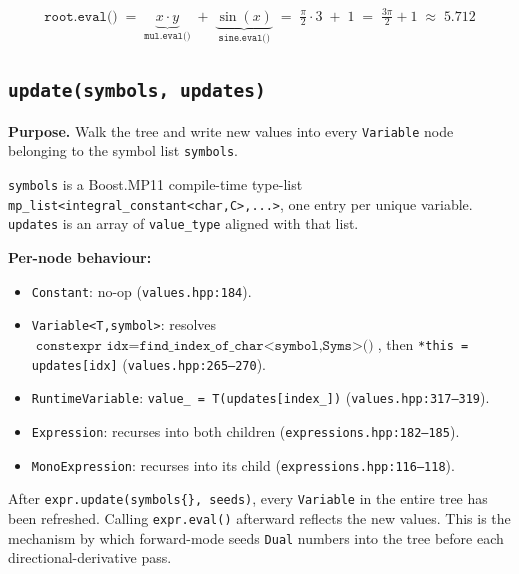 \documentclass[11pt,a4paper]{article}
\newcommand{\code}[1]{\texttt{#1}}
\begin{document}
\begin{tcolorbox}[exbox={{Example: $f(\pi/2,\,3)$}}]
\[
  \texttt{root.eval()}
  \;=\; \underbrace{x \cdot y}_{\texttt{mul.eval()}}
  \;+\; \underbrace{\sin(x)}_{\texttt{sine.eval()}}
  \;=\; \tfrac{\pi}{2}\cdot3 \;+\; 1
  \;=\; \tfrac{3\pi}{2}+1 \;\approx\; 5.712
\]
\end{tcolorbox}

\subsection{\texttt{update(symbols, updates)}}
\label{sec:update}

\textbf{Purpose.} Walk the tree and write new values into every \code{Variable}
node belonging to the symbol list \code{symbols}.

\medskip
\noindent\code{symbols} is a Boost.MP11 compile-time type-list
\code{mp\_list<integral\_constant<char,C>,...>}, one entry per unique variable.
\code{updates} is an array of \code{value\_type} aligned with that list.

\medskip\noindent\textbf{Per-node behaviour:}
\begin{itemize}
  \item \code{Constant}: no-op (\texttt{values.hpp:184}).
  \item \code{Variable<T,symbol>}: resolves
    $\texttt{constexpr idx} = \texttt{find\_index\_of\_char<symbol,Syms>()}$,
    then \code{*this = updates[idx]} (\texttt{values.hpp:265--270}).
  \item \code{RuntimeVariable}: \code{value\_ = T(updates[index\_])}
    (\texttt{values.hpp:317--319}).
  \item \code{Expression}: recurses into both children
    (\texttt{expressions.hpp:182--185}).
  \item \code{MonoExpression}: recurses into its child
    (\texttt{expressions.hpp:116--118}).
\end{itemize}

\begin{tcolorbox}[rulebox={Key invariant}]
After \code{expr.update(symbols\{\}, seeds)}, every \code{Variable} in the
entire tree has been refreshed.  Calling \code{expr.eval()} afterward reflects
the new values.  This is the mechanism by which forward-mode seeds
\code{Dual} numbers into the tree before each directional-derivative pass.
\end{tcolorbox}
\end{document}
